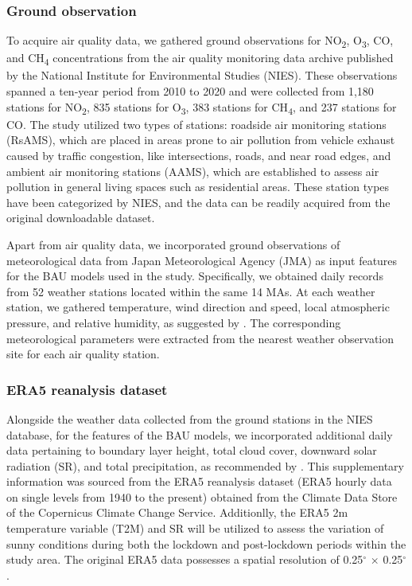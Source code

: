 \subsubsection{Ground observation}
To acquire air quality data, we gathered ground observations for NO\textsubscript{2}, O\textsubscript{3}, CO, and CH\textsubscript{4} concentrations from the air quality monitoring data archive published by the National Institute for Environmental Studies (NIES). These observations spanned a ten-year period from 2010 to 2020 and were collected from 1,180 stations for NO\textsubscript{2}, 835 stations for O\textsubscript{3}, 383 stations for CH\textsubscript{4}, and 237 stations for CO. The study utilized two types of stations: roadside air monitoring stations (RsAMS), which are placed in areas prone to air pollution from vehicle exhaust caused by traffic congestion, like intersections, roads, and near road edges, and ambient air monitoring stations (AAMS), which are established to assess air pollution in general living spaces such as residential areas. These station types have been categorized by NIES, and the data can be readily acquired from the original downloadable dataset. \par
Apart from air quality data, we incorporated ground observations of meteorological data from Japan Meteorological Agency (JMA) as input features for the BAU models used in the study. Specifically, we obtained daily records from 52 weather stations located within the same 14 MAs. At each weather station, we gathered temperature, wind direction and speed, local atmospheric pressure, and relative humidity, as suggested by \citep{grange2021covid}. The corresponding meteorological parameters were extracted from the nearest weather observation site for each air quality station.\par

\subsubsection{ERA5 reanalysis dataset}
Alongside the weather data collected from the ground stations in the NIES database, for the features of the BAU models, we incorporated additional daily data pertaining to boundary layer height, total cloud cover, downward solar radiation (SR), and total precipitation, as recommended by \citep{shi2021abrupt}. This supplementary information was sourced from the ERA5 reanalysis dataset (ERA5 hourly data on single levels from 1940 to the present) obtained from the Climate Data Store of the Copernicus Climate Change Service. Additionlly, the ERA5 2m temperature variable (T2M) and SR will be utilized to assess the variation of sunny conditions during both the lockdown and post-lockdown periods within the study area. The original ERA5 data possesses a spatial resolution of 0.25$^{\circ}$ $\times$ 0.25$^{\circ}$ .\par
